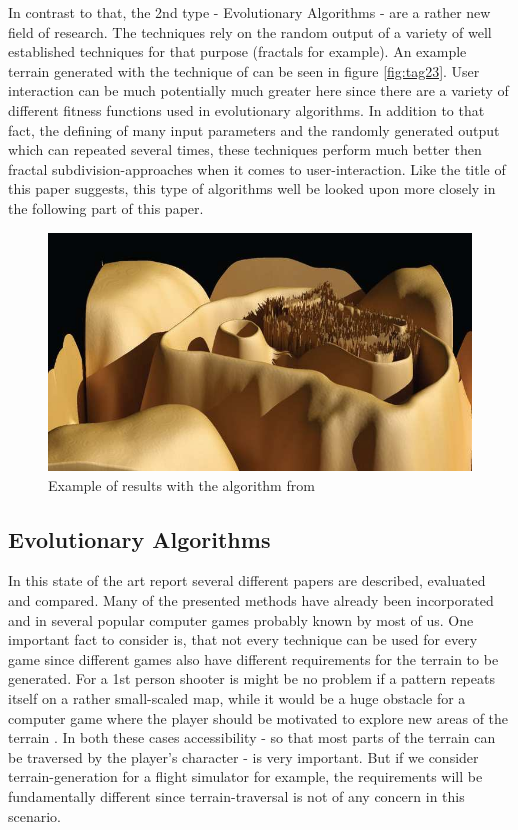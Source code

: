 In contrast to that, the 2nd type - Evolutionary Algorithms - are a rather new field of research. The techniques rely on the random output of a variety of well established techniques for that purpose (fractals for example). An example terrain generated with the technique of \cite{togelius2010towards} can be seen in figure \ref{fig:tag23}. User interaction can be much potentially much greater here since there are a variety of different fitness functions used in evolutionary algorithms. In addition to that fact, the defining of many input parameters and the randomly generated output which can repeated several times, these techniques perform much better then fractal subdivision-approaches when it comes to user-interaction. Like the title of this paper suggests, this type of algorithms well be looked upon more closely in the following part of this paper.

\begin{figure}[htb]
	\centering
	\includegraphics[width=\linewidth]{RZL12/hfhhf.jpg}
	\caption{Example of results with the algorithm from \cite{frade2009breeding}}
	\label{fig:tag19}
\end{figure}

\subsection{Evolutionary Algorithms}
In this state of the art report several different papers are described, evaluated and compared. Many of the presented methods have already been incorporated and in several popular computer games probably known by most of us. One important fact to consider is, that not every technique can be used for every game since different games also have different requirements for the terrain to be generated. For a 1st person shooter is might be no problem if a pattern repeats itself on a rather small-scaled map, while it would be a huge obstacle for a computer game where the player should be motivated to explore new areas of the terrain \cite{raffe2012survey}. In both these cases accessibility - so that most parts of the terrain can be traversed by the player's character - is very important. But if we consider terrain-generation for a flight simulator for example, the requirements will be fundamentally different since terrain-traversal is not of any concern in this scenario.

